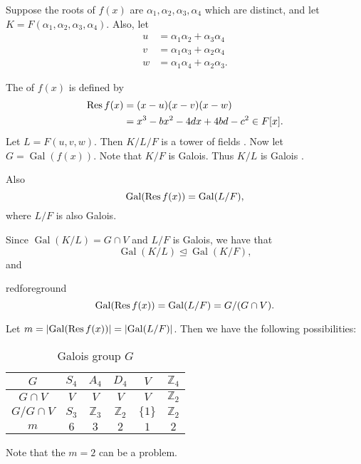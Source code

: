 \documentclass[notoc,notitlepage,nobib]{tufte-book}
\DeclareMathOperator{\Gal}{Gal}
\begin{document}
Suppose the roots of $f(x)$ are $\alpha_1, \alpha_2, \alpha_3, \alpha_4$ which
are distinct, and let $K = F(\alpha_1, \alpha_2, \alpha_3, \alpha_4)$. Also,
let
\begin{align*}
  u &= \alpha_1 \alpha_2 + \alpha_3 \alpha_4 \\
  v &= \alpha_1 \alpha_3 + \alpha_2 \alpha_4 \\
  w &= \alpha_1 \alpha_4 + \alpha_2 \alpha_3.
\end{align*}

The  of $f(x)$  is defined by
\begin{align*}
  \operatorname{Res} f(x) &= (x - u)(x - v)(x - w) \\
            &= x^3 - b x^2 - 4d x + 4bd - c^2 \in F[x].
\end{align*}
Let $L = F(u, v, w)$. Then $K / L / F$ is a tower of fields . Now
let $G = \Gal(f(x))$. Note that $K / F$ is Galois. Thus $K / L$ is Galois
.

Also
\begin{equation*}
  \Gal(\Res f(x)) = \Gal( L / F ),
\end{equation*}
where $L / F$ is also Galois.

Since $\Gal( K / L ) = G \cap V$ and $L / F$ is Galois, we have that
\begin{equation*}
  \Gal( K / L ) \trianglelefteq \Gal(K / F),
\end{equation*}
and
\begin{quotebox}{red}{foreground}
\begin{equation*}
  \Gal(\Res f(x)) = \Gal(L / F) = G / (G \cap V).
\end{equation*}
\end{quotebox}

Let $m = \abs{\Gal(\Res f(x))} = \abs{\Gal(L / F)}$. Then we have the following
possibilities:
\begin{table}[ht]
  \centering
  \caption{Galois group $G$}
  \label{table:galois_group_g}
  \begin{tabular}{c | c c c c c}
    $G$ & $S_4$ & $A_4$ & $D_4$ & $V$ & $\mathbb{Z}_4$ \\
    \hline
    $G \cap V$     & $V$   & $V$            & $V$            & $V$       & $\mathbb{Z}_2$ \\
    $G / G \cap V$ & $S_3$ & $\mathbb{Z}_3$ & $\mathbb{Z}_2$ & $\{ 1 \}$ & $\mathbb{Z}_2$ \\
    $m$            & $6$   & $3$            & $2$            & $1$       & $2$
  \end{tabular}
\end{table}
Note that the $m = 2$ can be a problem.
\end{document}

